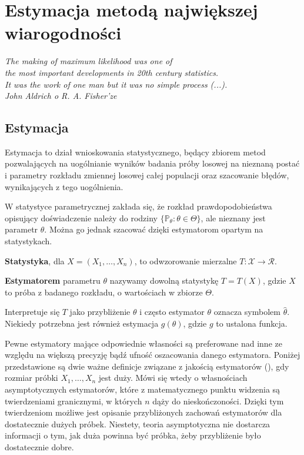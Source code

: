 \chapter{Estymacja metodą największej wiarogodności}\label{chap1}
\begin{flushright}
\textit{The making of maximum likelihood was one of \\
the most important developments in 20th century statistics. \\
It was the work of one man but it was no simple process (...). \\
John Aldrich o R. A. Fisher'ze
}
\end{flushright}

\section{Estymacja}

Estymacja to dział wnioskowania statystycznego, będący zbiorem metod pozwalających na uogólnianie wyników badania próby losowej na nieznaną postać i parametry rozkładu zmiennej losowej całej populacji oraz szacowanie błędów, wynikających z tego uogólnienia.

W statystyce parametrycznej zakłada się, że rozkład prawdopodobieństwa
opisujący doświadczenie należy do rodziny $\{\mathbb{P}_{\theta} : \theta \in \Theta\}$, ale nieznany jest
parametr $\theta$. Można go jednak szacować dzięki estymatorom opartym na statystykach.

\begin{definition}
\textbf{Statystyka}, dla $X=(X_1,\dots,X_n)$, to odwzorowanie mierzalne $T: \mathcal{X} \rightarrow \mathcal{R}.$
\end{definition}

\begin{definition}
\textbf{Estymatorem} parametru $\theta$ nazywamy dowolną statystykę
$T = T(X)$, gdzie $X$ to próba z badanego rozkładu, o wartościach w zbiorze $\Theta$. 
\end{definition}

Interpretuje się $T$ jako przybliżenie $\theta$ i często estymator $\theta$ oznacza symbolem $\hat{\theta}$. Niekiedy potrzebna jest również estymacja $g(\theta)$, gdzie $g$ to ustalona funkcja.

Pewne estymatory mające odpowiednie własności są preferowane nad inne ze względu na większą precyzję bądź ufność oszacowania danego estymatora. Poniżej przedstawione są dwie ważne definicje związane z jakością estymatorów (\cite{niemiro}), gdy rozmiar próbki $X_1, \dots , X_n$ jest duży. Mówi się wtedy o własnościach asymptotycznych estymatorów, które z matematycznego punktu widzenia są twierdzeniami
granicznymi, w których $n$ dąży do nieskończoności. Dzięki tym twierdzeniom możliwe jest opisanie przybliżonych zachowań estymatorów dla dostatecznie dużych próbek. Niestety, teoria asymptotyczna nie dostarcza informacji o tym, jak duża powinna być próbka, żeby przybliżenie było dostatecznie dobre.

